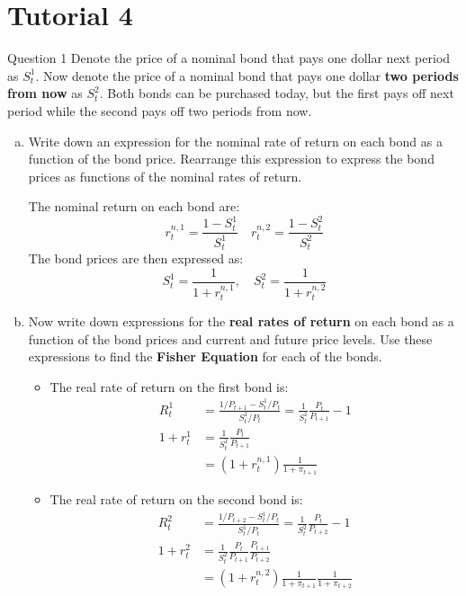 \documentclass[a4paper]{article}
\begin{document}
\section{Tutorial 4}
	\begin{questionbox}{Question 1}
		Denote the price of a nominal bond that pays one dollar next period as \( S_t^1 \). Now denote the price of a nominal bond that pays one dollar \textbf{two periods from now} as \( S_t^2 \). Both bonds can be purchased today, but the first pays off next period while the second pays off two periods from now.
		\begin{enumerate}[(a)]
			\item Write down an expression for the nominal rate of return on each bond as a function of the bond price. Rearrange this expression to express the bond prices as functions of the nominal rates of return.
			\begin{explanationbox}
				The nominal return on each bond are:
				\[
					r_t^{n,1} = \frac{1-S_t^1}{S_t^1} \quad r_t^{n,2} = \frac{1-S_t^2}{S_t^2}
				\]
				The bond prices are then expressed as:
				\[
					S_t^1 = \frac{1}{1 + r_t^{n,1}}, \quad S_t^2 = \frac{1}{1 + r_t^{n,2}}
				\]
			\end{explanationbox}
			\item Now write down expressions for the \textbf{real rates of return} on each bond as a function of the bond prices and current and future price levels. Use these expressions to find the \textbf{Fisher Equation} for each of the bonds.
			\begin{explanationbox}
				\begin{itemize}
					\item The real rate of return on the first bond is:
					\begin{align*}
						R_t^1 &= \frac{1/P_{t+1}-S_t^1/P_t}{S_t^1/P_t} = \frac{1}{S_t^1}\frac{P_t}{P_{t+1}} - 1\\
						1 + r_t^1 &= \frac{1}{S_t^1}\frac{P_t}{P_{t+1}}\\
						&= (1+r_t^{n,1}) \frac{1}{1+\pi_{t+1}}
					\end{align*}
					\item The real rate of return on the second bond is:
					\begin{align*}
						R_t^2 &= \frac{1/P_{t+2}-S_t^1/P_t}{S_t^1/P_t} = \frac{1}{S_t^2}\frac{P_t}{P_{t+2}} - 1\\
						1 + r_t^2 &= \frac{1}{S_t^2}\frac{P_t}{P_{t+1}}\frac{P_{t+1}}{P_{t+2}}\\
						&= (1+r_t^{n,2}) \frac{1}{1+\pi_{t+1}} \frac{1}{1+\pi_{t+2}}

\end{align*}
\end{itemize}
\end{explanationbox}
\end{enumerate}
\end{questionbox}
\end{document}
